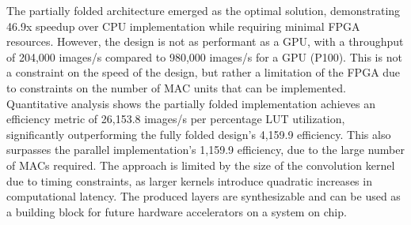 The partially folded architecture emerged as the optimal solution, demonstrating 46.9x speedup over CPU implementation while requiring minimal FPGA resources.
However, the design is not as performant as a GPU, with a throughput of 204,000 images/s compared to 980,000 images/s for a GPU (P100).
This is not a constraint on the speed of the design, but rather a limitation of the FPGA due to constraints on the number of MAC units that can be implemented.
Quantitative analysis shows the partially folded implementation achieves an efficiency metric of 26,153.8 images/s per percentage LUT utilization, significantly outperforming the fully folded design's 4,159.9 efficiency.
This also surpasses the parallel implementation's 1,159.9 efficiency, due to the large number of MACs required.
The approach is limited by the size of the convolution kernel due to timing constraints, as larger kernels introduce quadratic increases in computational latency.
The produced layers are synthesizable and can be used as a building block for future hardware accelerators on a system on chip.

%